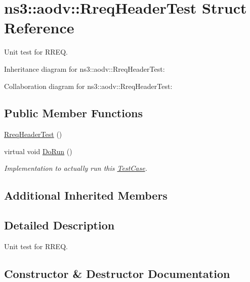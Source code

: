 \hypertarget{structns3_1_1aodv_1_1RreqHeaderTest}{}\section{ns3\+:\+:aodv\+:\+:Rreq\+Header\+Test Struct Reference}
\label{structns3_1_1aodv_1_1RreqHeaderTest}


Unit test for R\+R\+EQ.  




Inheritance diagram for ns3\+:\+:aodv\+:\+:Rreq\+Header\+Test\+:


Collaboration diagram for ns3\+:\+:aodv\+:\+:Rreq\+Header\+Test\+:
\subsection*{Public Member Functions}
\begin{DoxyCompactItemize}
\item 
\hyperlink{structns3_1_1aodv_1_1RreqHeaderTest_a69b33984a0d8efc1293cfba43e3c76d5}{Rreq\+Header\+Test} ()
\item 
virtual void \hyperlink{structns3_1_1aodv_1_1RreqHeaderTest_a0414012446d85ac0d24b76d6c148f440}{Do\+Run} ()
\begin{DoxyCompactList}\small\item\em Implementation to actually run this \hyperlink{classns3_1_1TestCase}{Test\+Case}. \end{DoxyCompactList}\end{DoxyCompactItemize}
\subsection*{Additional Inherited Members}


\subsection{Detailed Description}
Unit test for R\+R\+EQ. 

\subsection{Constructor \& Destructor Documentation}
